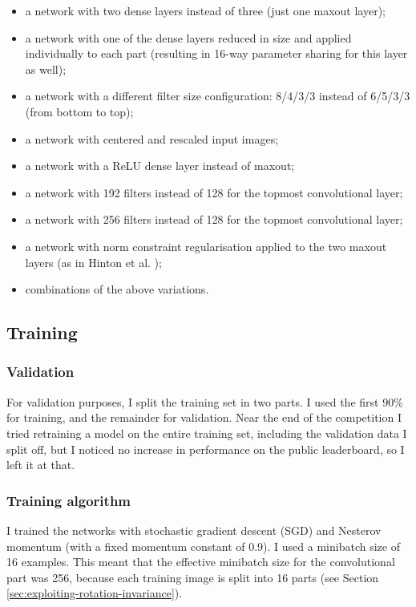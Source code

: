 \documentclass[a4paper,10pt]{article}
\begin{document}
\begin{itemize}
 \item a network with two dense layers instead of three (just one maxout layer);
 \item a network with one of the dense layers reduced in size and applied individually to each part (resulting in 16-way parameter sharing for this layer as well);
 \item a network with a different filter size configuration: 8/4/3/3 instead of 6/5/3/3 (from bottom to top);
 \item a network with centered and rescaled input images;
 \item a network with a ReLU dense layer instead of maxout;
 \item a network with 192 filters instead of 128 for the topmost convolutional layer;
 \item a network with 256 filters instead of 128 for the topmost convolutional layer;
 \item a network with norm constraint regularisation applied to the two maxout layers (as in Hinton et al. \cite{Hinton2012});
 \item combinations of the above variations.
\end{itemize}

\subsection{Training}

\subsubsection{Validation}

For validation purposes, I split the training set in two parts. I used the first 90\% for training, and the remainder for validation. Near the end of the competition I tried retraining a model on the entire training set, including the validation data I split off, but I noticed no increase in performance on the public leaderboard, so I left it at that.

\subsubsection{Training algorithm}

I trained the networks with stochastic gradient descent (SGD) and Nesterov momentum (with a fixed momentum constant of 0.9). I used a minibatch size of 16 examples. This meant that the effective minibatch size for the convolutional part was 256, because each training image is split into 16 parts (see Section \ref{sec:exploiting-rotation-invariance}).
\end{document}
